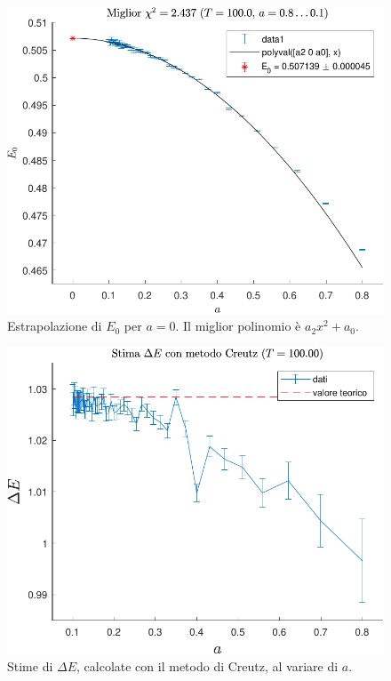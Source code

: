 \documentclass[11pt, a4paper]{article}
\begin{document}
\begin{figure}[H]
  \centering
  \includegraphics{../plots/qao/final/extrap_E0_fit-crop.pdf}
  \caption{Estrapolazione di $E_0$ per $a=0$. Il miglior polinomio è $a_2 x^2 + a_0$.}
\end{figure}

\begin{figure}[H]
  \centering
  \includegraphics{../plots/qao/final/de_creutz_a0.80-0.10_T100-crop.pdf}
  \caption{Stime di $\Delta E$, calcolate con il metodo di Creutz, al variare di $a$.}
\end{figure}
\end{document}
